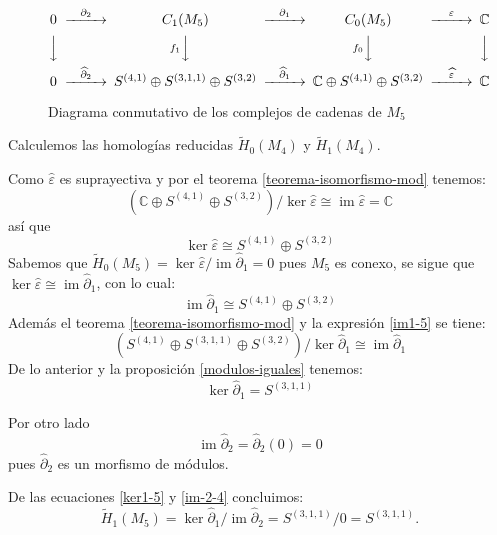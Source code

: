 \documentclass[12pt]{book}
\theoremstyle{definition}
\DeclareMathOperator{\im}{im}
\newcounter{in}
\begin{document}
\begin{figure}[h]
  \centering
    \[
    \begin{CD}
      0 @>{\partial_{2}}>> C_{1}(M_{5}) @>{\partial_{1}}>> C_{0}(M_{5}) @>{\varepsilon}>> \mathbb{C}\\
      @VVV   @Vf_{1} VV   @Vf_{0} VV   @VVV    \\
      0 @>{\widehat\partial_{2}}>> S^{(4,1)}\oplus S^{(3,1,1)}\oplus
      S^{(3,2)} @>{\widehat\partial_{1}}>> \mathbb{C}\oplus S^{(4,1)}
      \oplus S^{(3,2)} @>{\widehat \varepsilon}>> \mathbb{C}
    \end{CD}
    \]

    \caption{Diagrama conmutativo de los complejos de cadenas de
      $M_{5}$}
\label{fig:diagrama-conmutativo5}
\end{figure}

Calculemos las homologías reducidas $\widetilde H_{0}(M_{4})$ y
$\widetilde H_{1}(M_{4})$.

Como $\widehat\varepsilon$ es suprayectiva y por el teorema \ref{teorema-isomorfismo-mod} tenemos:
$$(\mathbb{C}\oplus S^{(4,1)} \oplus
S^{(3,2)})/\ker\widehat\varepsilon\cong\im\widehat\varepsilon=\mathbb{C}$$
así que
\begin{equation*}
\label{ker0-5}
\ker\widehat\varepsilon\cong S^{(4,1)} \oplus S^{(3,2)}
\end{equation*}
Sabemos que $\widetilde H_{0}(M_{5})=\ker \widehat\varepsilon/\im
\widehat\partial_{1}=0$ pues $M_{5}$  es
conexo, se sigue que $\ker \widehat\varepsilon\cong
\im\widehat\partial_{1}$, con lo cual:
\begin{equation}
\label{im1-5}
\im \widehat\partial_{1}\cong S^{(4,1)} \oplus S^{(3,2)}
\end{equation}
Además el teorema \ref{teorema-isomorfismo-mod} y la expresión \ref{im1-5} se tiene:
$$(S^{(4,1)}\oplus S^{(3,1,1)}\oplus S^{(3,2)})/\ker
\widehat\partial_{1}\cong \im \widehat\partial_{1}$$
De lo anterior y la proposición \ref{modulos-iguales} tenemos:
\begin{equation}
\label{ker1-5}
\ker \widehat\partial_{1}= S^{(3,1,1)}
\end{equation}

Por otro lado
\begin{equation}
\im\widehat\partial_{2}=\widehat\partial_{2}(0)=0
\label{im-2-4}
\end{equation}
pues $\widehat\partial_{2}$ es un morfismo de módulos.

De las ecuaciones \ref{ker1-5} y \ref{im-2-4} concluimos:
\begin{equation*}
  \widetilde H_{1}(M_{5})=\ker \widehat\partial_{1}/\im \widehat\partial_{2}=S^{(3,1,1)}/0=S^{(3,1,1)}.
\end{equation*}
 
\end{document}
